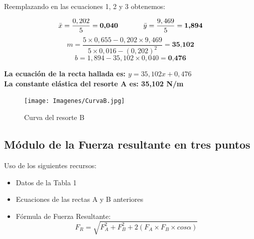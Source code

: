 \documentclass[10pt]{article}
\begin{document}
\vspace{0,2cm}
Reemplazando en las ecuaciones 1, 2 y 3 obtenemos:

\begin{equation*}
    \Bar{x} = \frac{0,202}{5} = \textbf{0,040} \textcolor{Blanco}{.............} \Bar{y} = \frac{9,469}{5} = \textbf{1,894}
\end{equation*}
\vspace{0,1cm}
\begin{equation*}
    m = \frac{5\times0,655-0,202\times9,469}{5\times0,016 - (0,202)^{2}} = \textbf{35,102} 
\end{equation*}
\vspace{0,1cm}
\begin{equation*}
    b = 1,894 - 35,102\times0,040 = \textbf{0,476}
\end{equation*}

\vspace{-0,7cm}
\begin{center}
\textbf{La ecuación de la recta hallada es: $y = 35,102x + 0,476$}\\[0,3cm]
\textbf{La constante elástica del resorte A es: 35,102 N/m}
\end{center}

\newpage
\hspace{1cm}
\begin{figure}[H]
    \begin{center}
    \caption{Curva del resorte B}
        \texttt{[image: Imagenes/CurvaB.jpg]}
    \end{center}
\end{figure}

\subsection{Módulo de la Fuerza resultante en tres puntos}\vspace{2mm}

Uso de los siguientes recursos:
\begin{itemize}
    \item Datos de la Tabla 1
    \item Ecuaciones de las rectas A y B anteriores
    \item Fórmula de Fuerza Resultante:
    \large{\begin{equation}
        F_{R} = \sqrt{F^{2}_{A} + F^{2}_{B} + 2(F_{A} \times F_{B} \times cos \alpha)}
    \end{equation}}
\end{itemize}
\end{document}
